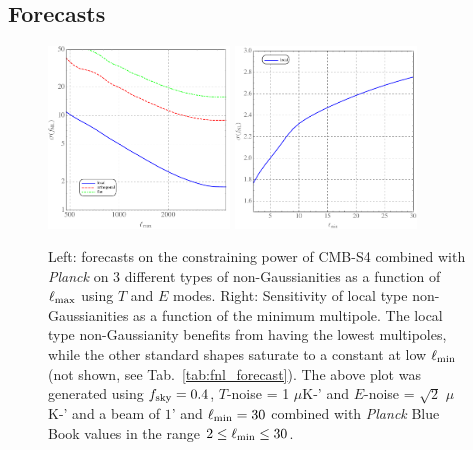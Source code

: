 \subsection{Forecasts}

\begin{figure}[htbp!]
\centering
\includegraphics[width=0.43\textwidth]{Inflation/DeltaFNL_TTT}
\includegraphics[width=0.43\textwidth]{Inflation/DeltaFNL_TTT_lmin}
\caption{Left: forecasts on the constraining power of CMB-S4 combined with {\it Planck} on 3 different types of non-Gaussianities as a function of $\ell_{\rm max}$ using $T$ and $E$ modes. Right: Sensitivity of local type non-Gaussianities as a function of the minimum multipole. The local type non-Gaussianity benefits from having the lowest multipoles, while the other standard shapes saturate to a constant at low $\ell_{\rm min}$ (not shown, see Tab.~\ref{tab:fnl_forecast}). The above plot was generated using $f_{\rm sky} = 0.4$, $T$-noise = 1 $\mu$K-' and $E$-noise = $\sqrt{2}$ $\mu$K-' and a beam of $1$' and $\ell_{\rm min} = 30$ combined with {\it Planck} Blue Book values in the range $2\leq \ell_{\rm min} \leq 30$.}
\label{fig_fnlforecast}
\end{figure}

